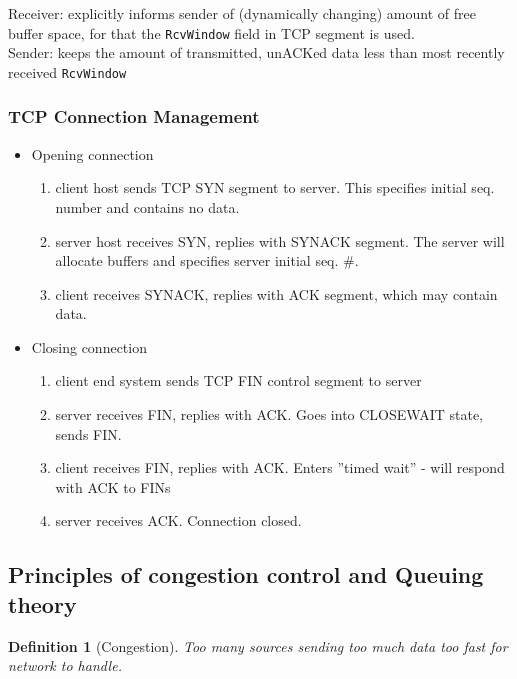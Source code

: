 \documentclass[10pt, a4paper, twocolumn]{scrartcl}
\newtheorem{definition}{Definition}
\begin{document}
Receiver: explicitly informs sender of (dynamically changing) amount of free buffer space, for that the \verb#RcvWindow# field in TCP segment is used.\\

Sender: keeps the amount of transmitted, unACKed data less than most recently received \verb#RcvWindow#

\subsubsection{TCP Connection Management}

\begin{itemize}
	\item Opening connection
		\begin{enumerate}
			\item client host sends TCP SYN segment to server. This specifies initial seq. number and contains no data.
			\item server host receives SYN, replies with SYNACK segment. The server will allocate buffers and specifies server initial seq. \#.
			\item client receives SYNACK, replies with ACK segment, which may contain data.
		\end{enumerate}
	\item Closing connection
		\begin{enumerate}
			\item client end system sends TCP FIN control segment to server
			\item server receives FIN, replies with ACK. Goes into CLOSEWAIT state, sends FIN.
			\item client receives FIN, replies with ACK. Enters ''timed wait'' - will respond with ACK to FINs
			\item server receives ACK. Connection closed.
		\end{enumerate}
\end{itemize}


\subsection{Principles of congestion control and Queuing theory}

\begin{definition}[Congestion]
	Too many sources sending too much data too fast for network to handle.
\end{definition}
\end{document}
